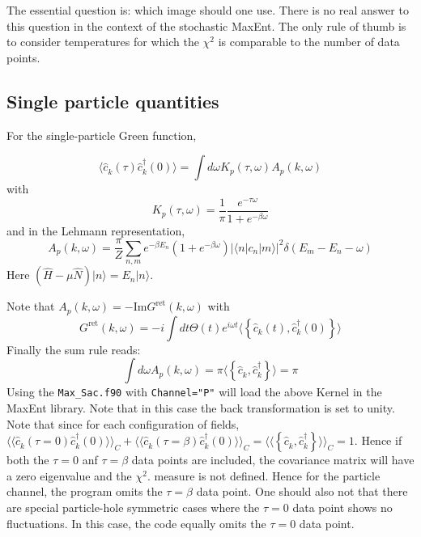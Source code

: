 The essential question is: which image should one use. There is no real answer to this question in the context of the stochastic MaxEnt. The only rule of thumb is to consider temperatures for which the \( \chi^2 \) is  comparable to the number of data points.


\subsection{Single particle quantities}
For the single-particle Green function, 

\begin{equation} 
	\langle \hat{c}^{\phantom\dagger}_{k} (\tau)  \hat{c}^{\dagger}_{k} (0)   \rangle   = \int d \omega  K_p(\tau,\omega)   A_p(k, \omega) 
\end{equation}
with 
\begin{equation}
K_{p}(\tau,\omega) =    \frac{1}{\pi} \frac{e^{-\tau \omega} }  {  1 + e^{-\beta\omega} }
\end{equation}
and in the Lehmann representation, 
 \begin{equation}
   A_p(k, \omega) = \frac{ \pi}{Z} \sum_{n,m} e^{-\beta E_n } \left( 1 + e^{-\beta \omega}\right) | \langle n | c_n | m  \rangle |^{2} \delta \left( E_m - E_n - \omega \right)  
\end{equation}  
Here $ \left( \hat{H} - \mu \hat{N} \right) | n \rangle = E_n | n \rangle  $.

Note that  $ A_p(k, \omega)  = - \text{Im} G^{\text{ret}} (k, \omega) $ with 
\begin{equation}
	G^{\text{ret}} (k, \omega)  = -i \int d t \Theta(t)  e^{i \omega t} \langle \left\{ \hat{c}^{\phantom\dagger}_{k} (t), \hat{c}^{\dagger}_{k} (0) \right\} \rangle
\end{equation}
Finally the sum rule reads:
\begin{equation}
	\int d \omega  A_p(k, \omega)  = \pi \langle  \left\{ \hat{c}^{\phantom\dagger}_{k} , \hat{c}^{\dagger}_{k}  \right\}   \rangle = \pi 
\end{equation}
Using the \texttt{Max\_Sac.f90}  with \texttt{Channel="P"}   will  load the above Kernel in the MaxEnt library.  Note that in this case the back  transformation is set to unity.  
Note that since for each  configuration of fields,  $ \langle  \langle \hat{c}^{\phantom\dagger}_{k} (\tau=0)  \hat{c}^{\dagger}_{k} (0)   \rangle  \rangle_{C} +   
\langle \langle \hat{c}^{\phantom\dagger}_{k} (\tau=\beta)  \hat{c}^{\dagger}_{k} (0)   \rangle \rangle_{C} = 
\langle \langle \left\{ \hat{c}^{\phantom\dagger}_{k},   \hat{c}^{\dagger}_{k}    \right\} \rangle \rangle_{C}   = 1$.  Hence if both  the $\tau=0$ anf $\tau=\beta$ data points are included, the covariance matrix will have a zero eigenvalue and the $\chi^{2}$. measure is not defined. Hence for the particle channel, the program omits the $\tau=\beta$ data point.     One should also not that there are special  particle-hole symmetric  cases where the $\tau=0$ data point shows no  fluctuations. In this case, the 
code equally omits the $\tau=0$ data point. 
